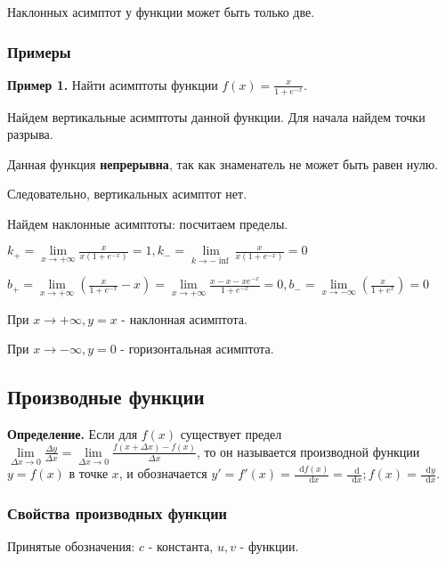 \documentclass{article}
\newcommand*\diff{\mathop{}\!\mathrm{d}}
\begin{document}
\begin{flushleft}
\hfill

Наклонных асимптот у функции может быть только две.

\subsubsection{Примеры}

\textbf{Пример 1.} Найти асимптоты функции $f(x) = \frac{x}{1 + e^{-x}}$.

\hfill

Найдем вертикальные асимптоты данной функции. Для начала найдем точки разрыва.

Данная функция \textbf{непрерывна}, так как знаменатель не может быть равен нулю.

Следовательно, вертикальных асимптот нет.

\hfill 

Найдем наклонные асимптоты: посчитаем пределы.

$k_{+} = \lim\limits_{x \to +\infty} \frac{x}{x(1+e^{-x})} = 1, k_{-} = \lim\limits_{k \to -\inf} \frac{x}{x(1+e^{-x})} = 0$

$b_{+} = \lim\limits_{x \to +\infty} (\frac{x}{1+e^{-x}} - x) = \lim\limits_{x \to +\infty} \frac{x - x - x e^{-x}}{1 + e^{-x}} = 0, b_{-} = \lim\limits_{x \to -\infty} (\frac{x}{1 + e^x}) = 0$

\hfill

При $x \to +\infty, y = x$ - наклонная асимптота.

При $x \to -\infty, y = 0$ - горизонтальная асимптота.

\subsection{Производные функции}

\textbf{Определение.} Если для $f(x)$ существует предел $\lim\limits_{\Delta x \to 0} \frac{\Delta y}{\Delta x} = \lim\limits_{\Delta x \to 0} \frac{f(x + \Delta x) - f(x)}{\Delta x}$, то он называется производной функции $y = f(x)$ в точке $x$, и обозначается $y' = f'(x) = \frac{\diff f(x)}{\diff x} = \frac{\diff}{\diff x}; f(x) = \frac{\diff y}{\diff x}$.

\subsubsection{Свойства производных функции}

Принятые обозначения: $c$ - константа, $u, v$ - функции.


\end{flushleft}
\end{document}

